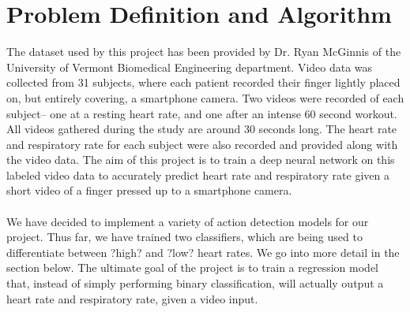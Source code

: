 \documentclass{article}
\begin{document}
\section*{Problem Definition and Algorithm}{The dataset used by this project has been provided by Dr. Ryan McGinnis of the University of Vermont Biomedical Engineering department. Video data was collected from 31 subjects, where each patient recorded their finger lightly placed on, but entirely covering, a smartphone camera. Two videos were recorded of each subject-- one at a resting heart rate, and one after an intense 60 second workout. All videos gathered during the study are around 30 seconds long. The heart rate and respiratory rate for each subject were also recorded and provided along with the video data. The aim of this project is to train a deep neural network on this labeled video data to accurately predict heart rate and respiratory rate given a short video of a finger pressed up to a smartphone camera. \\ \\
\noindent We have decided to implement a variety of action detection models for our project. Thus far, we have trained two classifiers, which are being used to differentiate between ?high? and ?low? heart rates. We go into more detail in the section below. The ultimate goal of the project is to train a regression model that, instead of simply performing binary classification, will actually output a heart rate and respiratory rate, given a video input. }
\end{document}
